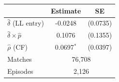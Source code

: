 \begin{tabular}{lcc}
\toprule
 & Estimate & SE \\
\midrule
$\hat{\delta}$ (LL entry) & -0.0248 & (0.0735) \\
$\hat{\delta} \times \hat{p}$ & 0.1076 & (0.1355) \\
$\hat{\rho}$ (CF) & 0.0697$^{*}$ & (0.0397) \\
\midrule
Matches & \multicolumn{2}{c}{76,708} \\
Episodes & \multicolumn{2}{c}{2,126} \\
\bottomrule
\end{tabular}
